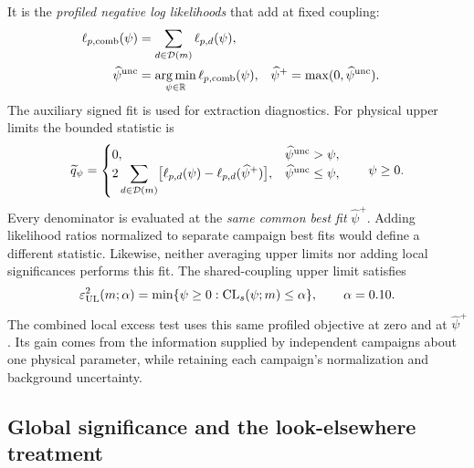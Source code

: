 It is the \emph{profiled negative log likelihoods} that add at fixed coupling:
\begin{align}
 \ell_{p,\rm comb}(\psi)
 &=\sum_{d\in\mathcal D(m)}\ell_{p,d}(\psi),
 \label{eq:v501-common-profile-sum}\\
 \widehat\psi^{\rm unc}
 &=\operatorname*{arg\,min}_{\psi\in\mathbb R}\ell_{p,\rm comb}(\psi),
 &\widehat\psi^+&=\max(0,\widehat\psi^{\rm unc}).
\end{align}
The auxiliary signed fit is used for extraction diagnostics. For physical
upper limits the bounded statistic is
\begin{equation}
 \widetilde q_{\psi}=
 \begin{cases}
 0,&\widehat\psi^{\rm unc}>\psi,\\
 2\displaystyle\sum_{d\in\mathcal D(m)}
 \bigl[\ell_{p,d}(\psi)-\ell_{p,d}(\widehat\psi^+)\bigr],
 &\widehat\psi^{\rm unc}\leq\psi,
 \end{cases}
 \qquad \psi\geq0.
 \label{eq:v501-common-bounded-statistic}
\end{equation}
Every denominator is evaluated at the \emph{same common best fit}
$\widehat\psi^+$. Adding likelihood ratios normalized to separate
campaign best fits would define a different statistic. Likewise, neither
averaging upper limits nor adding local significances performs this fit.
The shared-coupling upper limit satisfies
\begin{equation}
 \varepsilon^2_{\rm UL}(m;\alpha)
 =\min\{\psi\geq0:\mathrm{CL}_s(\psi;m)\leq\alpha\},
 \qquad \alpha=0.10.
\end{equation}
The combined local excess test uses this same profiled objective at zero
and at $\widehat\psi^+$. Its gain comes from the information supplied by
independent campaigns about one physical parameter, while retaining each
campaign's normalization and background uncertainty.

\subsection{Global significance and the look-elsewhere treatment}

